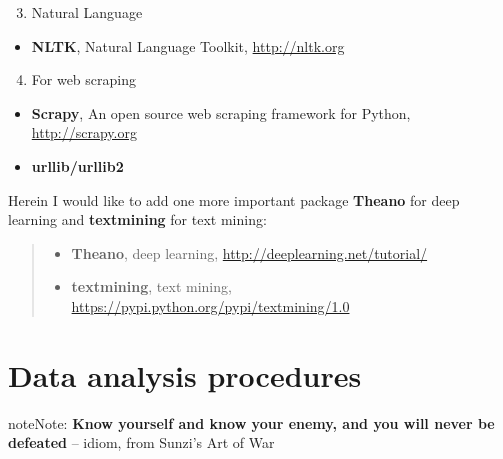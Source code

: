 \documentclass[letterpaper,11pt,english]{sphinxmanual}
\begin{document}
\begin{enumerate}
\setcounter{enumi}{2}
\item {} 
Natural Language

\end{enumerate}
\begin{itemize}
\item {} 
\textbf{NLTK}, Natural Language Toolkit, \href{http://nltk.org}{http://nltk.org}

\end{itemize}
\begin{enumerate}
\setcounter{enumi}{3}
\item {} 
For web scraping

\end{enumerate}
\begin{itemize}
\item {} 
\textbf{Scrapy}, An open source web scraping framework for Python, \href{http://scrapy.org}{http://scrapy.org}

\item {} 
\textbf{urllib/urllib2}

\end{itemize}

Herein I would like to add one more important package \textbf{Theano} for deep learning and \textbf{textmining} for text mining:
\begin{quote}
\begin{itemize}
\item {} 
\textbf{Theano}, deep learning, \href{http://deeplearning.net/tutorial/}{http://deeplearning.net/tutorial/}

\item {} 
\textbf{textmining}, text mining, \href{https://pypi.python.org/pypi/textmining/1.0}{https://pypi.python.org/pypi/textmining/1.0}

\end{itemize}
\end{quote}
\label{dap:dap}

\chapter{Data analysis procedures}
\label{dap:index-0}\label{dap:data-analysis-procedures}\label{dap::doc}
\begin{notice}{note}{Note:}
\textbf{Know yourself and know your enemy, and you will never be defeated} -- idiom, from Sunzi's Art of War
\end{notice}
\end{document}
